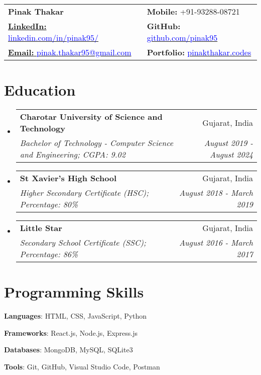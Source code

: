 \documentclass[a4paper,11pt]{article}
\makeatletter
\newcommand{\resumeSubheading}[4]{
  \vspace{-1pt}\item
  \begin{tabular*}{0.97\textwidth}{l@{\extracolsep{\fill}}r}
    \textbf{#1} & #2 \\
    \textit{#3} & \textit{#4} \\
  \end{tabular*}\vspace{-5pt}
}
\newcommand{\resumeSubHeadingListStart}{\begin{itemize}[leftmargin=*]}
\newcommand{\resumeSubHeadingListEnd}{\end{itemize}}
\makeatother
\begin{document}
\begin{tabular*}{\textwidth}{@{\extracolsep{\fill}}ll}
  \textbf{{\LARGE Pinak Thakar}} & \textbf{Mobile:} +91-93288-08721 \\
  \href{https://www.linkedin.com/in/pinak95/}{\textbf{LinkedIn:} \textcolor{blue}{linkedin.com/in/pinak95/}} & \textbf{GitHub:} \href{https://github.com/pinak95}{\textcolor{blue}{github.com/pinak95}} \\
  \href{mailto:pinak.thakar95@gmail.com}{\textbf{Email:} \textcolor{blue}{pinak.thakar95@gmail.com}} & \textbf{Portfolio:} \href{https://pinakthakar.codes}{\textcolor{blue}{pinakthakar.codes}}
\end{tabular*}

\section{\textbf{{\LARGE Education}}}
\resumeSubHeadingListStart
  \resumeSubheading
  {Charotar University of Science and Technology}{Gujarat, India}
  {Bachelor of Technology - Computer Science and Engineering; CGPA: 9.02}{August 2019 - August 2024}
  \resumeSubheading
  {St Xavier's High School}{Gujarat, India}
  {Higher Secondary Certificate (HSC); Percentage: 80\%}{August 2018 - March 2019}
  \resumeSubheading
  {Little Star}{Gujarat, India}
  {Secondary School Certificate (SSC); Percentage: 86\%}{August 2016 - March 2017}
\resumeSubHeadingListEnd

\section{\textbf{{\LARGE Programming Skills}}}
\begin{description}[font=$\bullet$]
\item{\textbf{Languages}: HTML, CSS, JavaScript, Python}
  \item{\textbf{Frameworks}: React.js, Node.js, Express.js}
  \item{\textbf{Databases}: MongoDB, MySQL, SQLite3}
  \item{\textbf{Tools}: Git, GitHub, Visual Studio Code, Postman}
\end{description}

\end{document}
